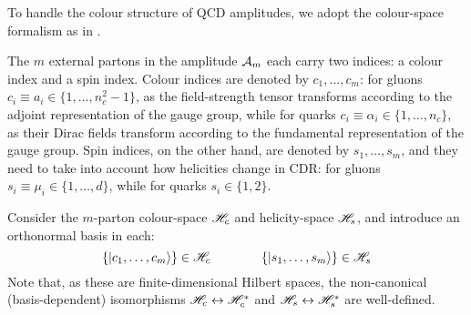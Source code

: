 To handle the colour structure of QCD amplitudes, we adopt the colour-space formalism as in \cite{Catani-1997}.

The $ m $ external partons in the amplitude $ \mathcal{A}_m $ each carry two indices: a colour index and a spin index. Colour indices are denoted by $ c_1, \dots, c_m $: for gluons $ c_i \equiv a_i \in \{1, \dots, n_c^2 - 1\} $, as the field-strength tensor  transforms according to the adjoint representation of the gauge group, while for quarks $ c_i \equiv \alpha_i \in \{1, \dots, n_c\} $, as their Dirac fields transform according to the fundamental representation of the gauge group. Spin indices, on the other hand, are denoted by $ s_1, \dots, s_m $, and they need to take into account how helicities change in CDR: for gluons $ s_i \equiv \mu_i \in \{1, \dots, d\} $, while for quarks $ s_i \in \{1,2\} $.

Consider the $ m $-parton colour-space $ \mathscr{H}_c $ and helicity-space $ \mathscr{H}_s $, and introduce an orthonormal basis in each:
\begin{equation*}
  \{\ket{c_1, \dots, c_m}\} \in \mathscr{H}_c
  \qquad \qquad
  \{\ket{s_1, \dots, s_m}\} \in \mathscr{H}_s
\end{equation*}
Note that, as these are finite-dimensional Hilbert spaces, the non-canonical (basis-dependent) isomorphisms $ \mathscr{H}_c \leftrightarrow \mathscr{H}_c^* $ and $ \mathscr{H}_s \leftrightarrow \mathscr{H}_s^* $ are well-defined\footnotemark.


